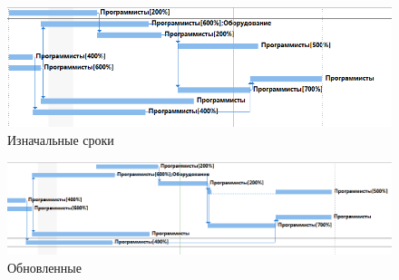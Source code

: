 \begin{figure}[H]
	\centering
	\includegraphics[width=0.7\linewidth]{src/task0_4}
	\caption{Изначальные сроки}
	\label{fig:task04}
\end{figure}
\begin{figure}[H]
	\centering
	\includegraphics[width=0.7\linewidth]{src/task0_3}
	\caption{Обновленные}
	\label{fig:task03}
\end{figure}







